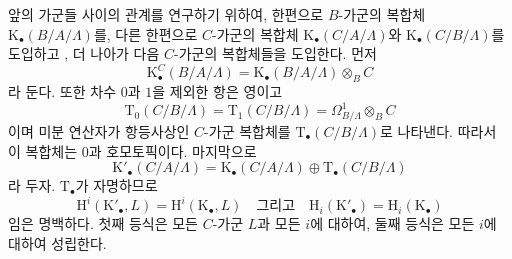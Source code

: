 \begin{env}[20.6.15]
\label{0.20.6.15-ko}
앞의 가군들 사이의 관계를 연구하기 위하여, 한편으로 $B$-가군의
복합체 $\mathrm K_\bullet(B/A/\Lambda)$를, 다른 한편으로 $C$-가군의
복합체
$\mathrm K_\bullet(C/A/\Lambda)$와
$\mathrm K_\bullet(C/B/\Lambda)$를 도입하고
, 더 나아가 다음 $C$-가군의 복합체들을
도입한다. 먼저
\begin{equation}
\tag{20.6.15.1}
\label{0.20.6.15.1-ko}
  \mathrm K^C_\bullet(B/A/\Lambda)=
  \mathrm K_\bullet(B/A/\Lambda)\otimes_B C
\end{equation}
라 둔다. 또한 차수 $0$과 $1$을 제외한 항은 영이고
\begin{equation}
\tag{20.6.15.2}
\label{0.20.6.15.2-ko}
  \mathrm T_0(C/B/\Lambda)=\mathrm T_1(C/B/\Lambda)=
  \Omega^1_{B/\Lambda}\otimes_B C
\end{equation}
이며 미분 연산자가 항등사상인 $C$-가군 복합체를
$\mathrm T_\bullet(C/B/\Lambda)$로 나타낸다. 따라서 이 복합체는
$0$과 호모토픽이다. 마지막으로
\begin{equation}
\tag{20.6.15.3}
\label{0.20.6.15.3-ko}
  \mathrm K'_\bullet(C/A/\Lambda)=
  \mathrm K_\bullet(C/A/\Lambda)\oplus
  \mathrm T_\bullet(C/B/\Lambda)
\end{equation}
라 두자. $\mathrm T_\bullet$가 자명하므로
\begin{equation}
\tag{20.6.15.4}
\label{0.20.6.15.4-ko}
  \mathrm H^i(\mathrm K'_\bullet,L)=
  \mathrm H^i(\mathrm K_\bullet,L)
  \quad\text{그리고}\quad
  \mathrm H_i(\mathrm K'_\bullet)=
  \mathrm H_i(\mathrm K_\bullet)
\end{equation}
임은 명백하다. 첫째 등식은 모든 $C$-가군 $L$과 모든 $i$에
대하여, 둘째 등식은 모든 $i$에 대하여 성립한다.
\end{env}

